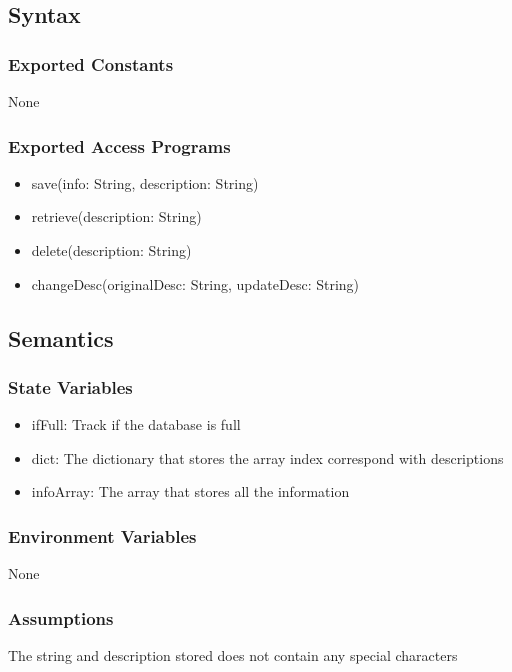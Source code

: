 \documentclass[12pt, titlepage]{article}
\begin{document}
\subsection{Syntax}

\subsubsection{Exported Constants}
\hspace{1.5em}None

\subsubsection{Exported Access Programs}

\begin{itemize}
\item save(info: String, description: String)
\item retrieve(description: String)
\item delete(description: String)
\item changeDesc(originalDesc: String, updateDesc: String)
\end{itemize}

\subsection{Semantics}

\subsubsection{State Variables}
\begin{itemize}
\item ifFull: Track if the database is full
\item dict: The dictionary that stores the array index correspond with descriptions
\item infoArray: The array that stores all the information
\end{itemize}

\subsubsection{Environment Variables}
\hspace{1.5em}None

\subsubsection{Assumptions}
\hspace{1.5em}The string and description stored does not contain any special characters
\end{document}
